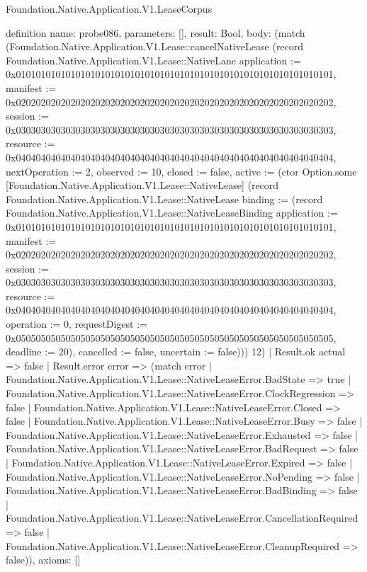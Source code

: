 \begin{lexlean}{Foundation.Native.Application.V1.LeaseCorpus}
\begin{semanticmodule}
definition{
  name: probe086,
  parameters: [],
  result: Bool,
  body: (match (Foundation.Native.Application.V1.Lease::cancelNativeLease (record Foundation.Native.Application.V1.Lease::NativeLane {application := 0x0101010101010101010101010101010101010101010101010101010101010101, manifest := 0x0202020202020202020202020202020202020202020202020202020202020202, session := 0x0303030303030303030303030303030303030303030303030303030303030303, resource := 0x0404040404040404040404040404040404040404040404040404040404040404, nextOperation := 2, observed := 10, closed := false, active := (ctor Option.some [Foundation.Native.Application.V1.Lease::NativeLease] (record Foundation.Native.Application.V1.Lease::NativeLease {binding := (record Foundation.Native.Application.V1.Lease::NativeLeaseBinding {application := 0x0101010101010101010101010101010101010101010101010101010101010101, manifest := 0x0202020202020202020202020202020202020202020202020202020202020202, session := 0x0303030303030303030303030303030303030303030303030303030303030303, resource := 0x0404040404040404040404040404040404040404040404040404040404040404, operation := 0, requestDigest := 0x0505050505050505050505050505050505050505050505050505050505050505, deadline := 20}), cancelled := false, uncertain := false}))}) 12)
    | Result.ok actual => false
    | Result.error error => (match error
      | Foundation.Native.Application.V1.Lease::NativeLeaseError.BadState => true
      | Foundation.Native.Application.V1.Lease::NativeLeaseError.ClockRegression => false
      | Foundation.Native.Application.V1.Lease::NativeLeaseError.Closed => false
      | Foundation.Native.Application.V1.Lease::NativeLeaseError.Busy => false
      | Foundation.Native.Application.V1.Lease::NativeLeaseError.Exhausted => false
      | Foundation.Native.Application.V1.Lease::NativeLeaseError.BadRequest => false
      | Foundation.Native.Application.V1.Lease::NativeLeaseError.Expired => false
      | Foundation.Native.Application.V1.Lease::NativeLeaseError.NoPending => false
      | Foundation.Native.Application.V1.Lease::NativeLeaseError.BadBinding => false
      | Foundation.Native.Application.V1.Lease::NativeLeaseError.CancellationRequired => false
      | Foundation.Native.Application.V1.Lease::NativeLeaseError.CleanupRequired => false)),
  axioms: []
}


\end{semanticmodule}
\end{lexlean}
